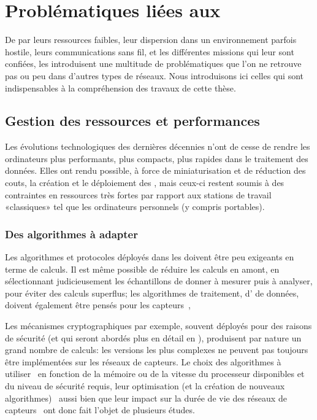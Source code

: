 \section{Problématiques liées aux \rcs}

De par leurs ressources faibles, leur dispersion dans un environnement parfois hostile, leurs communications sans fil, et les différentes missions qui leur sont confiées, les \rcsfs introduisent une multitude de problématiques que l'on ne retrouve pas ou peu dans d'autres types de réseaux.
Nous introduisons ici celles qui sont indispensables à la compréhension des travaux de cette thèse.

    \subsection{Gestion des ressources et performances}
Les évolutions technologiques des dernières décennies n'ont de cesse de rendre les ordinateurs plus performants, plus compacts, plus rapides dans le traitement des données.
Elles ont rendu possible, à force de miniaturisation et de réduction des couts, la création et le déploiement des \rcsfs, mais ceux-ci restent soumis à des contraintes en ressources très fortes par rapport aux stations de travail «classiques» tel que les ordinateurs personnels (y compris portables).

        \subsubsection{Des algorithmes à adapter}
Les algorithmes et protocoles déployés dans les \rcs doivent être peu exigeants en terme de calculs.
Il est même possible de réduire les calculs en amont, en sélectionnant judicieusement les échantillons de donner à mesurer puis à analyser, pour éviter des calculs superflus; les algorithmes de traitement, d' de données, doivent également être pensés pour les capteurs~\cite{ACFP09},

Les mécanismes cryptographiques par exemple, souvent déployés pour des raisons de sécurité (et qui seront abordés plus en détail en ), produisent par nature un grand nombre de calculs: les versions les plus complexes ne peuvent pas toujours être implémentées sur les réseaux de capteurs.
Le choix des algorithmes à utiliser~\cite{LDH06} en fonction de la mémoire ou de la vitesse du processeur disponibles et du niveau de sécurité requis, leur optimisation (et la création de nouveaux algorithmes)~\cite{GNL12} aussi bien que leur impact sur la durée de vie des réseaux de capteurs~\cite{PLP06} ont donc fait l'objet de plusieurs études.

